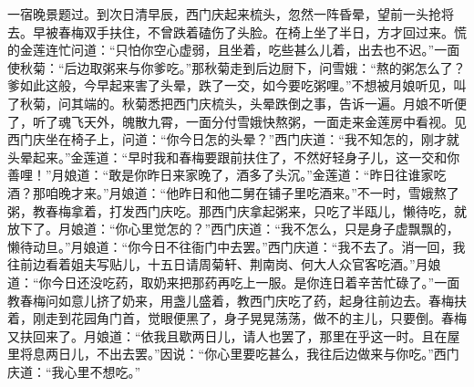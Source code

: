 一宿晚景题过。到次日清早辰，西门庆起来梳头，忽然一阵昏晕，望前一头抢将去。早被春梅双手扶住，不曾跌着磕伤了头脸。在椅上坐了半日，方才回过来。慌的金莲连忙问道：“只怕你空心虚弱，且坐着，吃些甚么儿着，出去也不迟。”一面使秋菊：“后边取粥来与你爹吃。”那秋菊走到后边厨下，问雪娥：“熬的粥怎么了？爹如此这般，今早起来害了头晕，跌了一交，如今要吃粥哩。”不想被月娘听见，叫了秋菊，问其端的。秋菊悉把西门庆梳头，头晕跌倒之事，告诉一遍。月娘不听便了，听了魂飞天外，魄散九霄，一面分付雪娥快熬粥，一面走来金莲房中看视。见西门庆坐在椅子上，问道：“你今日怎的头晕？”西门庆道：“我不知怎的，刚才就头晕起来。”金莲道：“早时我和春梅要跟前扶住了，不然好轻身子儿，这一交和你善哩！”月娘道：“敢是你昨日来家晚了，酒多了头沉。”金莲道：“昨日往谁家吃酒？那咱晚才来。”月娘道：“他昨日和他二舅在铺子里吃酒来。”不一时，雪娥熬了粥，教春梅拿着，打发西门庆吃。那西门庆拿起粥来，只吃了半瓯儿，懒待吃，就放下了。月娘道：“你心里觉怎的？”西门庆道：“我不怎么，只是身子虚飘飘的，懒待动旦。”月娘道：“你今日不往衙门中去罢。”西门庆道：“我不去了。消一回，我往前边看着姐夫写贴儿，十五日请周菊轩、荆南岗、何大人众官客吃酒。”月娘道：“你今日还没吃药，取奶来把那药再吃上一服。是你连日着辛苦忙碌了。”一面教春梅问如意儿挤了奶来，用盏儿盛着，教西门庆吃了药，起身往前边去。春梅扶着，刚走到花园角门首，觉眼便黑了，身子晃晃荡荡，做不的主儿，只要倒。春梅又扶回来了。月娘道：“依我且歇两日儿，请人也罢了，那里在乎这一时。且在屋里将息两日儿，不出去罢。”因说：“你心里要吃甚么，我往后边做来与你吃。”西门庆道：“我心里不想吃。”

